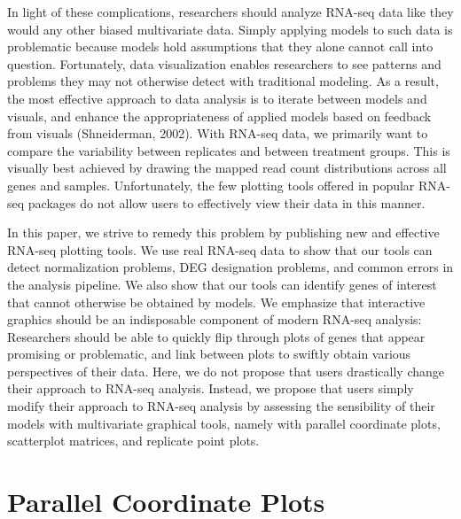 \documentclass[useAMS,referee]{biom}
\begin{document}
In light of these complications, researchers should analyze RNA-seq data like they would any other biased multivariate data. Simply applying models to such data is problematic because models hold assumptions that they alone cannot call into question. Fortunately, data visualization enables researchers to see patterns and problems they may not otherwise detect with traditional modeling. As a result, the most effective approach to data analysis is to iterate between models and visuals, and enhance the appropriateness of applied models based on feedback from visuals (Shneiderman, 2002). With RNA-seq data, we primarily want to compare the variability between replicates and between treatment groups. This is visually best achieved by drawing the mapped read count distributions across all genes and samples. Unfortunately, the few plotting tools offered in popular RNA-seq packages do not allow users to effectively view their data in this manner.

In this paper, we strive to remedy this problem by publishing new and effective RNA-seq plotting tools. We use real RNA-seq data to show that our tools can detect normalization problems, DEG designation problems, and common errors in the analysis pipeline. We also show that our tools can identify genes of interest that cannot otherwise be obtained by models. We emphasize that interactive graphics should be an indisposable component of modern RNA-seq analysis: Researchers should be able to quickly flip through plots of genes that appear promising or problematic, and link between plots to swiftly obtain various perspectives of their data. Here, we do not propose that users drastically change their approach to RNA-seq analysis. Instead, we propose that users simply modify their approach to RNA-seq analysis by assessing the sensibility of their models with multivariate graphical tools, namely with parallel coordinate plots, scatterplot matrices, and replicate point plots.

\section{Parallel Coordinate Plots}
\label{s:Parallel Coordinate Plots}

\end{document}
